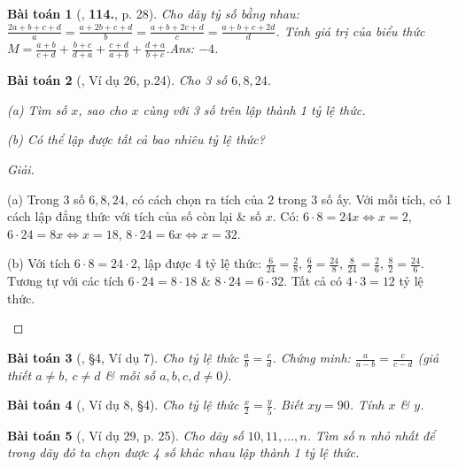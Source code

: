 \documentclass{article}
\numberwithin{equation}{section}
\newtheorem{baitoan}{Bài toán}
\begin{document}
\begin{baitoan}[\cite{Tuyen_Toan_7}, \textbf{114.}, p. 28]
	Cho dãy tỷ số bằng nhau: $\frac{2a + b + c + d}{a} = \frac{a + 2b + c + d}{b} = \frac{a + b + 2c + d}{c} = \frac{a + b + c + 2d}{d}$. Tính giá trị của biểu thức $M = \frac{a + b}{c + d} + \frac{b + c}{d + a} + \frac{c + d}{a + b} + \frac{d + a}{b + c}$.\hfill{\sf Ans:} $-4$.
\end{baitoan}

\begin{baitoan}[\cite{Binh_Toan_7_tap_1}, Ví dụ 26, p.24]
	Cho 3 số $6,8,24$.
	\begin{enumerate*}
		\item[(a)] Tìm số $x$, sao cho $x$ cùng với 3 số trên lập thành 1 tỷ lệ thức.
		\item[(b)] Có thể lập được tất cả bao nhiêu tỷ lệ thức?
	\end{enumerate*}
\end{baitoan}

\begin{proof}[Giải]
	\begin{enumerate*}
		\item[(a)] Trong 3 số $6,8,24$, có  cách chọn ra tích của 2 trong 3 số ấy. Với mỗi tích, có 1 cách lập đẳng thức với tích của số còn lại \& số $x$. Có: $6\cdot8 = 24x\Leftrightarrow x = 2$, $6\cdot24 = 8x\Leftrightarrow x = 18$, $8\cdot24 = 6x\Leftrightarrow x = 32$.
		\item[(b)] Với tích $6\cdot 8 = 24\cdot 2$, lập được 4 tỷ lệ thức: $\frac{6}{24} = \frac{2}{8}$, $\frac{6}{2} = \frac{24}{8}$, $\frac{8}{24} = \frac{2}{6}$, $\frac{8}{2} = \frac{24}{6}$. Tương tự với các tích $6\cdot24 = 8\cdot 18$ \& $8\cdot24 = 6\cdot32$. Tất cả có $4\cdot3 = 12$ tỷ lệ thức.
	\end{enumerate*}
\end{proof}

\begin{baitoan}[\cite{Binh_Toan_7_tap_1}, \S4, Ví dụ 7]
	Cho tỷ lệ thức $\frac{a}{b} = \frac{c}{d}$. Chứng minh: $\frac{a}{a - b} = \frac{c}{c - d}$ (giả thiết $a\ne b$, $c\ne d$ \& mỗi số $a,b,c,d\ne 0$).
\end{baitoan}

\begin{baitoan}[\cite{Binh_Toan_7_tap_1}, Ví dụ 8, \S4]
	Cho tỷ lệ thức $\frac{x}{2} = \frac{y}{5}$. Biết $xy = 90$. Tính $x$ \& $y$.
\end{baitoan}

\begin{baitoan}[\cite{Binh_Toan_7_tap_1}, Ví dụ 29, p. 25]
	Cho dãy số $10,11,\ldots,n$. Tìm số $n$ nhỏ nhất để trong dãy đó ta chọn được 4 số khác nhau lập thành 1 tỷ lệ thức.
\end{baitoan}
\end{document}

